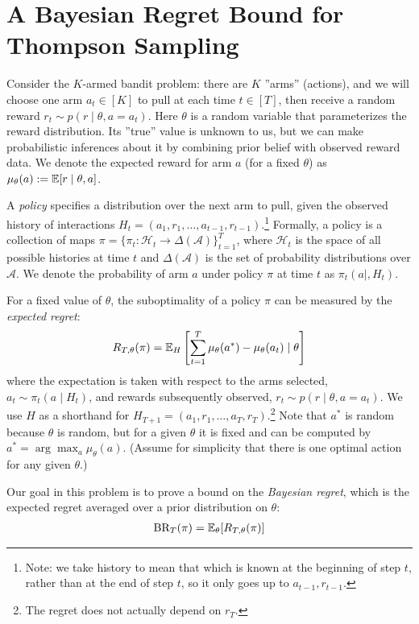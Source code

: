 \section{A Bayesian Regret Bound for Thompson Sampling}

Consider the $K$-armed bandit problem: there are $K$ ''arms'' (actions), and we will choose one arm $a_t \in [K]$ to pull at each time $t \in [T]$, then receive a random reward $r_t \sim p(r \mid \theta, a = a_{t})$. Here $\theta$ is a random variable that parameterizes the reward distribution. Its ''true'' value is unknown to us, but we can make probabilistic inferences about it by combining prior belief with observed reward data. We denote the expected reward for arm $a$ (for a fixed $\theta$) as $\mu_\theta(a) := \mathbb{E}[r \mid \theta, a]$. 

A \textit{policy} specifies a distribution over the next arm to pull, given the observed history of interactions $H_t = (a_1, r_1, \dots, a_{t-1}, r_{t-1})$.\footnote{Note: we take history to mean that which is known at the beginning of step $t$, rather than at the end of step $t$, so it only goes up to $a_{t-1}, r_{t-1}$.}
Formally, a policy is a collection of maps $ \pi = \{ \pi_{t} : \mathcal{H}_{t} \to \Delta(\mathcal{A})\}_{t=1}^T$, where $\mathcal{H}_{t}$ is the space of all possible histories at time $t$ and $\Delta(\mathcal{A})$ is the set of probability distributions over $\mathcal{A}$. We denote the probability of arm $a$ under policy $\pi$ at time $t$ as $\pi_t(a \mid ,H_{t})$.

For a fixed value of $\theta$, the suboptimality of a policy $\pi$ can be measured by the \textit{expected regret}:
\begin{align*}
R_{T, \theta}(\pi) = \mathbb{E}_H\left[\sum_{t=1}^T \mu_\theta(a^*) - \mu_\theta(a_t) \mid \theta\right]
\end{align*}
where the expectation is taken with respect to the arms selected, $a_t \sim \pi_t(a \mid H_t)$, and rewards subsequently observed, $r_t \sim p(r \mid \theta, a=a_t)$. We use $H$ as a shorthand for $H_{T+1} = (a_1, r_1, \dots, a_T, r_T)$.\footnote{The regret does not actually depend on $r_T$.} Note that $a^*$ is random because $\theta$ is random, but for a given $\theta$ it is fixed and can be computed by $a^* = \arg\max_a \mu_{\theta}(a)$. (Assume for simplicity that there is one optimal action for any given $\theta$.)

Our goal in this problem is to prove a bound on the \textit{Bayesian regret}, which is the expected regret averaged over a prior distribution on $\theta$:
\begin{align*}
\text{BR}_T(\pi) = \mathbb{E}_{\theta}[R_{T, \theta}(\pi)]
\end{align*}

